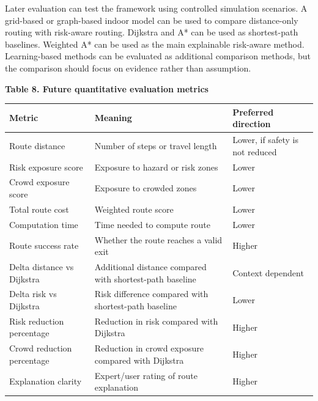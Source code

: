 \documentclass[
]{article}
\newcounter{none} %
\begin{document}
Later evaluation can test the framework using controlled simulation
scenarios. A grid-based or graph-based indoor model can be used to
compare distance-only routing with risk-aware routing. Dijkstra and A*
can be used as shortest-path baselines. Weighted A* can be used as the
main explainable risk-aware method. Learning-based methods can be
evaluated as additional comparison methods, but the comparison should
focus on evidence rather than assumption.

\textbf{Table 8. Future quantitative evaluation metrics}

{\def\LTcaptype{none} %
\begin{longtable}[]{@{}
  >{\raggedright\arraybackslash}p{}
  >{\raggedright\arraybackslash}p{}
  >{\raggedright\arraybackslash}p{}@{}}
\toprule\noalign{}
\begin{minipage}[b]{\linewidth}\raggedright
Metric
\end{minipage} & \begin{minipage}[b]{\linewidth}\raggedright
Meaning
\end{minipage} & \begin{minipage}[b]{\linewidth}\raggedright
Preferred direction
\end{minipage} \\
\midrule\noalign{}
\endhead
\bottomrule\noalign{}
\endlastfoot
Route distance & Number of steps or travel length & Lower, if safety is
not reduced \\
Risk exposure score & Exposure to hazard or risk zones & Lower \\
Crowd exposure score & Exposure to crowded zones & Lower \\
Total route cost & Weighted route score & Lower \\
Computation time & Time needed to compute route & Lower \\
Route success rate & Whether the route reaches a valid exit & Higher \\
Delta distance vs Dijkstra & Additional distance compared with
shortest-path baseline & Context dependent \\
Delta risk vs Dijkstra & Risk difference compared with shortest-path
baseline & Lower \\
Risk reduction percentage & Reduction in risk compared with Dijkstra &
Higher \\
Crowd reduction percentage & Reduction in crowd exposure compared with
Dijkstra & Higher \\
Explanation clarity & Expert/user rating of route explanation &
Higher \\
\end{longtable}
}
\end{document}
